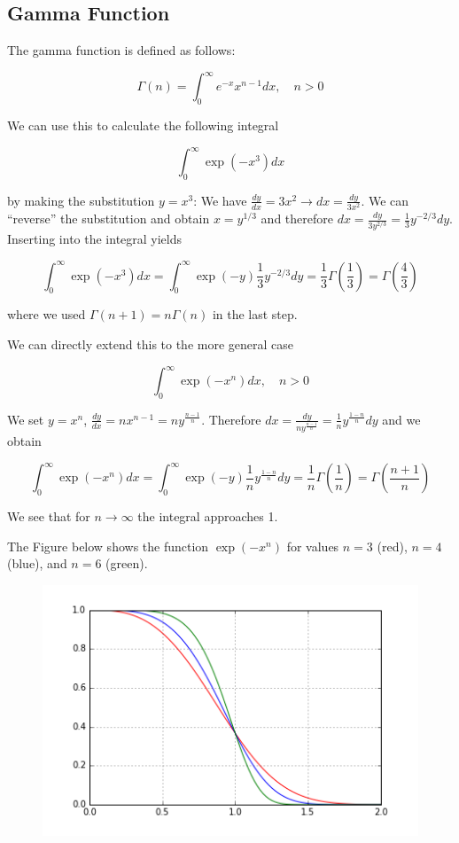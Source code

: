 
\subsection{Gamma Function}

The gamma function is defined as follows:

\[
\Gamma(n) = \int_0^\infty e^{-x} x^{n-1} dx, \quad n > 0
\]

We can use this to calculate the following integral

\[
\int_0^\infty \exp \left( -x^3 \right)dx
\]

by making the substitution \(y = x^3\): We have
\(\frac{dy}{dx} = 3x^2 \rightarrow dx = \frac{dy}{3x^2}\). We can
``reverse'' the substitution and obtain \(x = y^{1/3}\) and therefore
\(dx = \frac{dy}{3y^{2/3}} = \frac{1}{3}y^{-2/3} dy\). Inserting into
the integral yields

\[
\int_0^\infty \exp \left( -x^3 \right)dx = \int_0^\infty \exp(-y) \frac{1}{3}y^{-2/3} dy = \frac{1}{3} \Gamma \left( \frac{1}{3} \right) = \Gamma \left( \frac{4}{3} \right)
\]

where we used \(\Gamma(n+1) = n \Gamma(n)\) in the last step.

We can directly extend this to the more general case

\[
\int_0^\infty \exp \left( -x^n \right)dx, \quad n > 0
\]

We set \(y = x^n\),
\(\frac{dy}{dx} = n x ^{n-1} = n y^{\frac{n-1}{n}}\). Therefore
\(dx = \frac{dy}{n y^{\frac{n-1}{n}}} = \frac{1}{n} y^{\frac{1-n}{n}} dy\)
and we obtain

\[
\int_0^\infty \exp \left( -x^n \right) dx = \int_0^\infty \exp(-y) \frac{1}{n} y^{\frac{1-n}{n}} dy = \frac{1}{n} \Gamma \left( \frac{1}{n} \right) = \Gamma\left( \frac{n+1}{n} \right)
\]

We see that for \(n \rightarrow \infty\) the integral approaches 1.

The Figure below shows the function \(\exp \left( -x^n \right)\) for
values \(n=3\) (red), \(n=4\) (blue), and \(n=6\) (green).

\begin{figure}[H]
\centering
\includegraphics{images/interesting_integrals_05_1.png}
\end{figure}

